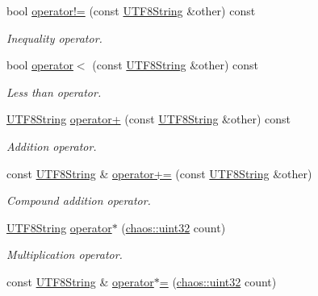 \begin{DoxyCompactItemize}
bool \hyperlink{classchaos_1_1str_1_1_u_t_f8_string_a166394399a4d200494b40e034aa330da}{operator!=} (const \hyperlink{classchaos_1_1str_1_1_u_t_f8_string}{U\-T\-F8\-String} \&other) const 
\begin{DoxyCompactList}\small\item\em Inequality operator. \end{DoxyCompactList}\item 
bool \hyperlink{classchaos_1_1str_1_1_u_t_f8_string_ac7b54ed9c42a9c9a0a386d453d2c1daa}{operator$<$} (const \hyperlink{classchaos_1_1str_1_1_u_t_f8_string}{U\-T\-F8\-String} \&other) const 
\begin{DoxyCompactList}\small\item\em Less than operator. \end{DoxyCompactList}\item 
\hyperlink{classchaos_1_1str_1_1_u_t_f8_string}{U\-T\-F8\-String} \hyperlink{classchaos_1_1str_1_1_u_t_f8_string_a0d624a8e308b9a04511d31558ae37d8d}{operator+} (const \hyperlink{classchaos_1_1str_1_1_u_t_f8_string}{U\-T\-F8\-String} \&other) const 
\begin{DoxyCompactList}\small\item\em Addition operator. \end{DoxyCompactList}\item 
const \hyperlink{classchaos_1_1str_1_1_u_t_f8_string}{U\-T\-F8\-String} \& \hyperlink{classchaos_1_1str_1_1_u_t_f8_string_a9ce7f005abc581590ff3823db749873f}{operator+=} (const \hyperlink{classchaos_1_1str_1_1_u_t_f8_string}{U\-T\-F8\-String} \&other)
\begin{DoxyCompactList}\small\item\em Compound addition operator. \end{DoxyCompactList}\item 
\hyperlink{classchaos_1_1str_1_1_u_t_f8_string}{U\-T\-F8\-String} \hyperlink{classchaos_1_1str_1_1_u_t_f8_string_a8b6c57015a5e29083c74da682bc4ddac}{operator$\ast$} (\hyperlink{namespacechaos_a3b3a47ba1e284655bf1a30c441121c60}{chaos\-::uint32} count)
\begin{DoxyCompactList}\small\item\em Multiplication operator. \end{DoxyCompactList}\item 
const \hyperlink{classchaos_1_1str_1_1_u_t_f8_string}{U\-T\-F8\-String} \& \hyperlink{classchaos_1_1str_1_1_u_t_f8_string_a653dcbb095d2db19042807d03372dfbd}{operator$\ast$=} (\hyperlink{namespacechaos_a3b3a47ba1e284655bf1a30c441121c60}{chaos\-::uint32} count)

\end{DoxyCompactItemize}
